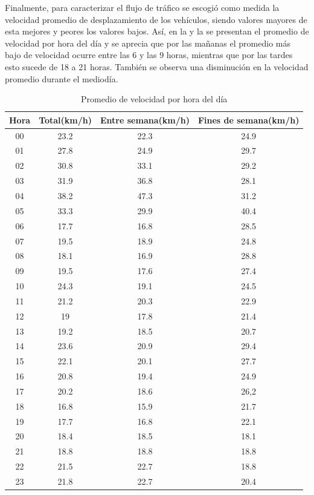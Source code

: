 Finalmente, para caracterizar el flujo de tráfico se escogió como medida la velocidad promedio de desplazamiento de los vehículos, siendo valores mayores de esta mejores y peores los valores bajos. Así, en la  y la  se presentan el promedio de velocidad por hora del día y se aprecia que por las mañanas el promedio más bajo de velocidad ocurre entre las 6 y las 9 horas, mientras que por las tardes esto sucede de 18 a 21 horas. También se observa una disminución en la velocidad promedio durante el mediodía. 

\begin{table}[h]
	\centering
	\begin{tabular}{cccc}
        \toprule
    	Hora  & Total(km/h) & Entre semana(km/h) & Fines de semana(km/h)\\
    	\midrule
    	00 & 23.2 & 22.3 & 24.9 \\
    	01 & 27.8 & 24.9 & 29.7 \\
    	02 & 30.8 & 33.1 & 29.2 \\ 
    	03 & 31.9 & 36.8 & 28.1\\
    	04 & 38.2 & 47.3 & 31.2\\
    	05 & 33.3 & 29.9 & 40.4\\
    	06 & 17.7 & 16.8 & 28.5\\
    	07 & 19.5 & 18.9 & 24.8\\
    	08 & 18.1 & 16.9 & 28.8\\
    	09 & 19.5 & 17.6 & 27.4\\ 
    	10 & 24.3 & 19.1 & 24.5\\
    	11 & 21.2 & 20.3 & 22.9\\
    	12 & 19 & 17.8 & 21.4\\
    	13 & 19.2 & 18.5 & 20.7\\
    	14 & 23.6 & 20.9 & 29.4\\
    	15 & 22.1 & 20.1 & 27.7\\
    	16 & 20.8 & 19.4 & 24.9\\ 
    	17 & 20.2 & 18.6 & 26,2\\
    	18 & 16.8 & 15.9 & 21.7\\
    	19 & 17.7 & 16.8 & 22.1\\
    	20 & 18.4 & 18.5 & 18.1\\
    	21 & 18.8 & 18.8 & 18.8\\
    	22 & 21.5 & 22.7 & 18.8\\
    	23 & 21.8 & 22.7 & 20.4\\
    	\bottomrule
	\end{tabular}
	\caption{Promedio de velocidad por hora del día} 
	\label{table:velocidad_por_hora}
\end{table}

